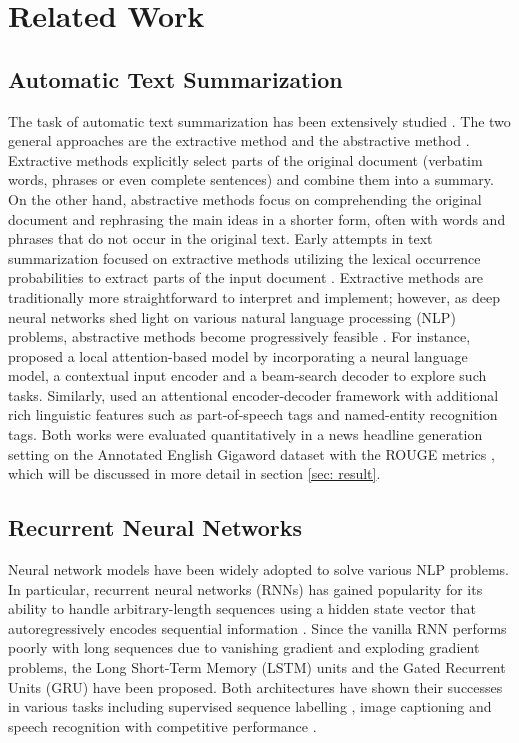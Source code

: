 \section{Related Work}
\label{sec: related_work}

\subsection{Automatic Text Summarization}

The task of automatic text summarization has been extensively studied \cite{gambhir2017recent}. The two general approaches are the extractive method and the abstractive method \cite{gupta2010survey}. Extractive methods explicitly select parts of the original document (verbatim words, phrases or even complete sentences) and combine them into a summary. On the other hand, abstractive methods focus on comprehending the original document and rephrasing the main ideas in a shorter form, often with words and phrases that do not occur in the original text. Early attempts in text summarization focused on extractive methods utilizing the lexical occurrence probabilities to extract parts of the input document \cite{mathis1973improvement}. Extractive methods are traditionally more straightforward to interpret and implement; however, as deep neural networks shed light on various natural language processing (NLP) problems, abstractive methods become progressively feasible \cite{nallapati2016sequence, nallapati2016abstractive, rush2015neural}. For instance, \cite{rush2015neural} proposed a local attention-based model by incorporating a neural language model, a contextual input encoder and a beam-search decoder to explore such tasks. Similarly, \cite{nallapati2016abstractive} used an attentional encoder-decoder framework with additional rich linguistic features such as part-of-speech tags and named-entity recognition tags. Both works were evaluated quantitatively in a news headline generation setting on the Annotated English Gigaword dataset \cite{graff2003english} with the ROUGE metrics \cite{lin2004rouge}, which will be discussed in more detail in section \ref{sec: result}. 

\subsection{Recurrent Neural Networks}
Neural network models have been widely adopted to solve various NLP problems. In particular, recurrent neural networks (RNNs) has gained popularity for its ability to handle arbitrary-length sequences using a hidden state vector that autoregressively encodes sequential information \cite{goodfellow2016}. Since the vanilla RNN performs poorly with long sequences due to vanishing gradient and exploding gradient problems, the Long Short-Term Memory (LSTM) units \cite{hochreiter1997long} and the Gated Recurrent Units (GRU) \cite{cho2014properties} have been proposed. Both architectures have shown their successes in various tasks including supervised sequence labelling \cite{graves2012supervised}, image captioning \cite{vinyals_2015} and speech recognition \cite{graves2013speech} with competitive performance \cite{yin2017comparative}.

